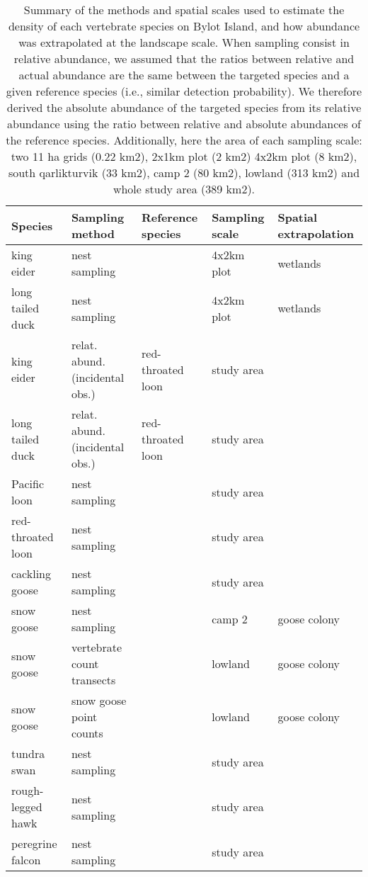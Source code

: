 \begin{table}[H]
\centering
\caption{Summary of the methods and spatial scales used to estimate the density of each vertebrate species on Bylot Island, and how abundance was extrapolated at the landscape scale. When sampling consist in relative abundance, we assumed that the ratios between relative and actual abundance are the same between the targeted species and a given reference species (i.e., similar detection probability). We therefore derived the absolute abundance of the targeted species from its relative abundance using the ratio between relative and absolute abundances of the reference species. Additionally, here the area of each sampling scale: two 11 ha grids (0.22 km2), 2x1km plot (2 km2) 4x2km plot (8 km2), south qarlikturvik (33 km2), camp 2 (80 km2), lowland (313 km2) and whole study area (389 km2).} 
\label{table:summary_methods}
\begingroup\fontsize{8pt}{10pt}\selectfont
\begin{tabularx}{\textwidth}{lllll}
  \hline
Species & Sampling method & Reference species & Sampling scale & Spatial extrapolation \\ 
  \hline
king eider & nest sampling &  & 4x2km plot & wetlands \\ 
  long tailed duck & nest sampling &  & 4x2km plot & wetlands \\ 
  king eider & relat. abund. (incidental obs.) & red-throated loon & study area &  \\ 
  long tailed duck & relat. abund. (incidental obs.) & red-throated loon & study area &  \\ 
  Pacific loon & nest sampling &  & study area &  \\ 
  red-throated loon & nest sampling &  & study area &  \\ 
  cackling goose & nest sampling &  & study area &  \\ 
  snow goose & nest sampling &  & camp 2 & goose colony \\ 
  snow goose & vertebrate count transects &  & lowland & goose colony \\ 
  snow goose & snow goose point counts &  & lowland & goose colony \\ 
  tundra swan & nest sampling &  & study area &  \\ 
  rough-legged hawk & nest sampling &  & study area &  \\ 
  peregrine falcon & nest sampling &  & study area &  \\ 

\end{tabularx}
\end{table}
